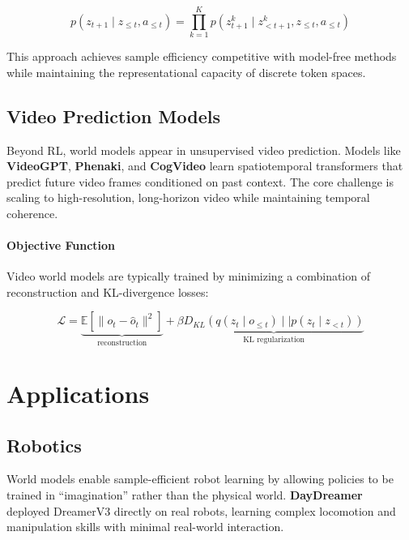 \documentclass{tufte-handout}
\begin{document}
\begin{equation}
    p(z_{t+1} \mid z_{\leq t}, a_{\leq t}) = \prod_{k=1}^K p(z_{t+1}^k \mid z_{< t+1}^k, z_{\leq t}, a_{\leq t})
\end{equation}

This approach achieves sample efficiency competitive with model-free methods while maintaining
the representational capacity of discrete token spaces.

\subsection{Video Prediction Models}

Beyond RL, world models appear in unsupervised video prediction. Models like \textbf{VideoGPT},
\textbf{Phenaki}, and \textbf{CogVideo} learn spatiotemporal transformers that predict future
video frames conditioned on past context. The core challenge is scaling to high-resolution,
long-horizon video while maintaining temporal coherence.

\paragraph{Objective Function}
Video world models are typically trained by minimizing a combination of reconstruction and
KL-divergence losses:

\begin{equation}
    \mathcal{L} = \underbrace{\mathbb{E}[\|o_t - \hat{o}_t\|^2]}_{\text{reconstruction}}
    + \beta \underbrace{D_{KL}(q(z_t \mid o_{\leq t}) \mid\mid p(z_t \mid z_{< t}))}_{\text{KL regularization}}
\end{equation}

\section{Applications}

\subsection{Robotics}
World models enable sample-efficient robot learning by allowing policies to be trained in
``imagination'' rather than the physical world. \textbf{DayDreamer}~\nocite{wu2023} deployed DreamerV3 directly on
real robots, learning complex locomotion and manipulation skills with minimal real-world
interaction.
\end{document}
